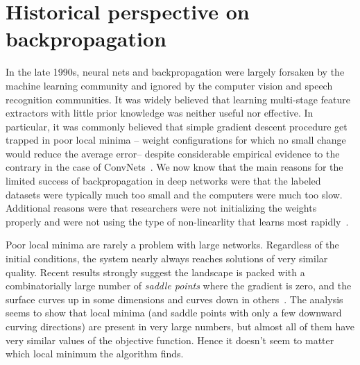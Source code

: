 \documentclass[10pts]{article}
\begin{document}




\section{Historical perspective on backpropagation}

In the late 1990s, neural nets and backpropagation were largely
forsaken by the machine learning community and ignored by the computer
vision and speech recognition communities.  It was widely believed
that learning multi-stage feature extractors with little prior knowledge 
was neither useful nor effective. In particular, it was commonly
believed that simple gradient descent procedure get trapped in poor
local minima -- weight configurations for which no small change would
reduce the average error-- despite considerable empirical evidence to
the contrary in the case of ConvNets~\citep{lecun-98}. We now know
that the main reasons for the limited success of backpropagation in
deep networks were that the labeled datasets were typically much too
small and the computers were much too slow. Additional reasons were
that researchers were not initializing the weights properly and were
not using the type of non-linearlity that learns most
rapidly~\citep{lecun-98b,GlorotAISTATS2010-small}.

Poor local minima are rarely a problem with large networks. Regardless
of the initial conditions, the system nearly always reaches solutions
of very similar quality.  Recent results strongly suggest the
landscape is packed with a combinatorially large number of {\em saddle
  points} where the gradient is zero, and the surface curves up in
some dimensions and curves down in
others~\citep{Dauphin-et-al-NIPS2014-small,Choromanska-et-al-AISTATS2015}.
The analysis seems to show that local minima (and saddle points with
only a few downward curving directions) are present in very large
numbers, but almost all of them have very similar values of the
objective function.  Hence it doesn't seem to matter which local
minimum the algorithm finds.
\end{document}
